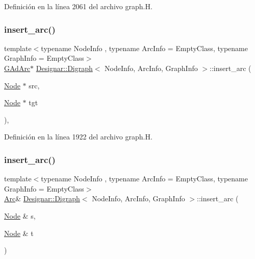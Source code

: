 Definición en la línea 2061 del archivo graph.\+H.

\mbox{\label{class_designar_1_1_digraph_a9180c479d24dc8dc648a37451c90d066}} 
\subsubsection{\texorpdfstring{insert\+\_\+arc()}{insert\_arc()}\hspace{0.1cm}{\footnotesize\ttfamily [1/4]}}
{\footnotesize\ttfamily template$<$typename Node\+Info , typename Arc\+Info  = Empty\+Class, typename Graph\+Info  = Empty\+Class$>$ \\
\hyperlink{class_designar_1_1_digraph_a0c6d846f23d1e82556fb6055557df53f}{G\+Ad\+Arc}$\ast$ \hyperlink{class_designar_1_1_digraph}{Designar\+::\+Digraph}$<$ Node\+Info, Arc\+Info, Graph\+Info $>$\+::insert\+\_\+arc (\begin{DoxyParamCaption}\item[{\hyperlink{class_designar_1_1_digraph_a4dc921c41a480b7946a04170e997d8ae}{Node} $\ast$}]{src,  }\item[{\hyperlink{class_designar_1_1_digraph_a4dc921c41a480b7946a04170e997d8ae}{Node} $\ast$}]{tgt }\end{DoxyParamCaption})\hspace{0.3cm}{\ttfamily [inline]}, {\ttfamily [protected]}}



Definición en la línea 1922 del archivo graph.\+H.

\mbox{\label{class_designar_1_1_digraph_a52b127c0102e207125c6f4eaaeb7ab26}} 
\subsubsection{\texorpdfstring{insert\+\_\+arc()}{insert\_arc()}\hspace{0.1cm}{\footnotesize\ttfamily [2/4]}}
{\footnotesize\ttfamily template$<$typename Node\+Info , typename Arc\+Info  = Empty\+Class, typename Graph\+Info  = Empty\+Class$>$ \\
\hyperlink{class_designar_1_1_digraph_a0ceb278671f2a535c00fddccdeafd69f}{Arc}\& \hyperlink{class_designar_1_1_digraph}{Designar\+::\+Digraph}$<$ Node\+Info, Arc\+Info, Graph\+Info $>$\+::insert\+\_\+arc (\begin{DoxyParamCaption}\item[{\hyperlink{class_designar_1_1_digraph_a4dc921c41a480b7946a04170e997d8ae}{Node} \&}]{s,  }\item[{\hyperlink{class_designar_1_1_digraph_a4dc921c41a480b7946a04170e997d8ae}{Node} \&}]{t }\end{DoxyParamCaption})\hspace{0.3cm}{\ttfamily [inline]}}



